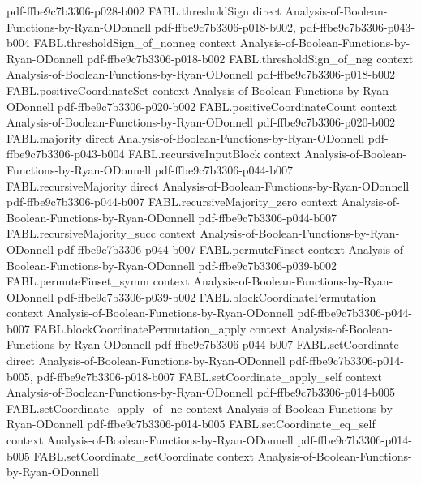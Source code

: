 \begin{theorem}
  {pdf-ffbe9c7b3306-p028-b002}
\proofstep
  {FABL.thresholdSign}
  {direct}
  {Analysis-of-Boolean-Functions-by-Ryan-ODonnell}
  {pdf-ffbe9c7b3306-p018-b002,
    pdf-ffbe9c7b3306-p043-b004}
\proofstep
  {FABL.thresholdSign_of_nonneg}
  {context}
  {Analysis-of-Boolean-Functions-by-Ryan-ODonnell}
  {pdf-ffbe9c7b3306-p018-b002}
\proofstep
  {FABL.thresholdSign_of_neg}
  {context}
  {Analysis-of-Boolean-Functions-by-Ryan-ODonnell}
  {pdf-ffbe9c7b3306-p018-b002}
\proofstep
  {FABL.positiveCoordinateSet}
  {context}
  {Analysis-of-Boolean-Functions-by-Ryan-ODonnell}
  {pdf-ffbe9c7b3306-p020-b002}
\proofstep
  {FABL.positiveCoordinateCount}
  {context}
  {Analysis-of-Boolean-Functions-by-Ryan-ODonnell}
  {pdf-ffbe9c7b3306-p020-b002}
\proofstep
  {FABL.majority}
  {direct}
  {Analysis-of-Boolean-Functions-by-Ryan-ODonnell}
  {pdf-ffbe9c7b3306-p043-b004}
\proofstep
  {FABL.recursiveInputBlock}
  {context}
  {Analysis-of-Boolean-Functions-by-Ryan-ODonnell}
  {pdf-ffbe9c7b3306-p044-b007}
\proofstep
  {FABL.recursiveMajority}
  {direct}
  {Analysis-of-Boolean-Functions-by-Ryan-ODonnell}
  {pdf-ffbe9c7b3306-p044-b007}
\proofstep
  {FABL.recursiveMajority_zero}
  {context}
  {Analysis-of-Boolean-Functions-by-Ryan-ODonnell}
  {pdf-ffbe9c7b3306-p044-b007}
\proofstep
  {FABL.recursiveMajority_succ}
  {context}
  {Analysis-of-Boolean-Functions-by-Ryan-ODonnell}
  {pdf-ffbe9c7b3306-p044-b007}
\proofstep
  {FABL.permuteFinset}
  {context}
  {Analysis-of-Boolean-Functions-by-Ryan-ODonnell}
  {pdf-ffbe9c7b3306-p039-b002}
\proofstep
  {FABL.permuteFinset_symm}
  {context}
  {Analysis-of-Boolean-Functions-by-Ryan-ODonnell}
  {pdf-ffbe9c7b3306-p039-b002}
\proofstep
  {FABL.blockCoordinatePermutation}
  {context}
  {Analysis-of-Boolean-Functions-by-Ryan-ODonnell}
  {pdf-ffbe9c7b3306-p044-b007}
\proofstep
  {FABL.blockCoordinatePermutation_apply}
  {context}
  {Analysis-of-Boolean-Functions-by-Ryan-ODonnell}
  {pdf-ffbe9c7b3306-p044-b007}
\proofstep
  {FABL.setCoordinate}
  {direct}
  {Analysis-of-Boolean-Functions-by-Ryan-ODonnell}
  {pdf-ffbe9c7b3306-p014-b005,
    pdf-ffbe9c7b3306-p018-b007}
\proofstep
  {FABL.setCoordinate_apply_self}
  {context}
  {Analysis-of-Boolean-Functions-by-Ryan-ODonnell}
  {pdf-ffbe9c7b3306-p014-b005}
\proofstep
  {FABL.setCoordinate_apply_of_ne}
  {context}
  {Analysis-of-Boolean-Functions-by-Ryan-ODonnell}
  {pdf-ffbe9c7b3306-p014-b005}
\proofstep
  {FABL.setCoordinate_eq_self}
  {context}
  {Analysis-of-Boolean-Functions-by-Ryan-ODonnell}
  {pdf-ffbe9c7b3306-p014-b005}
\proofstep
  {FABL.setCoordinate_setCoordinate}
  {context}
  {Analysis-of-Boolean-Functions-by-Ryan-ODonnell}

\end{theorem}
